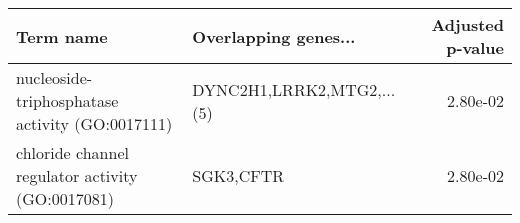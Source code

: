 \begin{tabular}{llr}
\toprule
                                       Term name &      Overlapping genes... &  Adjusted p-value \\
\midrule
 nucleoside-triphosphatase activity (GO:0017111) & DYNC2H1,LRRK2,MTG2,...(5) &          2.80e-02 \\
chloride channel regulator activity (GO:0017081) &                 SGK3,CFTR &          2.80e-02 \\
\bottomrule
\end{tabular}
